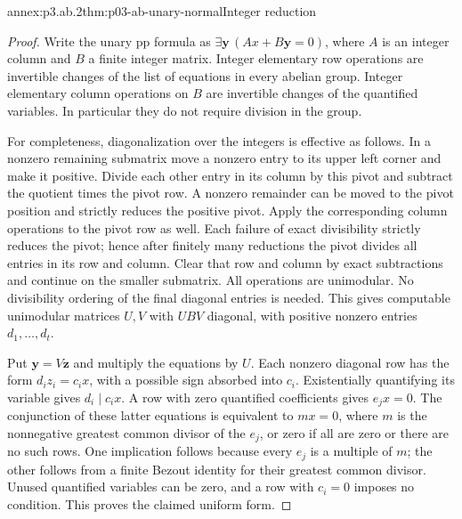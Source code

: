 \begin{annexitem}{annex:p3.ab.2}{thm:p03-ab-unary-normal}{Integer reduction}
\begin{proof}
Write the unary pp formula as
\(\exists\boldsymbol y\,(A x+B\boldsymbol y=0)\), where \(A\) is an
integer column and \(B\) a finite integer matrix. Integer elementary row
operations are invertible changes of the list of equations in every
abelian group. Integer elementary column operations on \(B\) are
invertible changes of the quantified variables. In particular they do
not require division in the group.

For completeness, diagonalization over the integers is effective as
follows. In a nonzero remaining submatrix move a nonzero entry to its
upper left corner and make it positive. Divide each other entry in its
column by this pivot and subtract the quotient times the pivot row.
A nonzero remainder can be moved to the pivot position and strictly
reduces the positive pivot. Apply the corresponding column operations
to the pivot row as well. Each failure of exact divisibility strictly
reduces the pivot; hence after finitely many reductions the pivot divides
all entries in its row and column. Clear that row and column by exact
subtractions and continue on the smaller submatrix. All operations are
unimodular. No divisibility ordering of the final diagonal entries is
needed. This gives computable unimodular matrices \(U,V\) with
\(UBV\) diagonal, with positive nonzero entries \(d_1,\ldots,d_t\).

Put \(\boldsymbol y=V\boldsymbol z\) and multiply the equations by \(U\).
Each nonzero diagonal row has the form \(d_i z_i=c_i x\), with a possible
sign absorbed into \(c_i\). Existentially quantifying its variable gives
\(d_i\mid c_i x\). A row with zero quantified coefficients gives
\(e_jx=0\). The conjunction of these latter equations is equivalent to
\(mx=0\), where \(m\) is the nonnegative greatest common divisor of
the \(e_j\), or zero if all are zero or there are no such rows. One
implication follows because every \(e_j\) is a multiple of \(m\); the
other follows from a finite Bezout identity for their greatest common
divisor. Unused quantified variables can be zero, and a row with
\(c_i=0\) imposes no condition. This proves the claimed uniform form.
\end{proof}
\end{annexitem}

